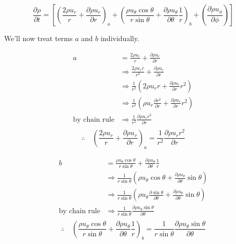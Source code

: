 \documentclass[12pt, letterpaper, twoside]{article}
\begin{document}
    \begin{equation}\label{eq:continuitywithaandb}
        \frac{\partial \rho}{\partial t}  =
        \left[
        \left(\frac{2 \rho u_r}{r} + \frac{\partial \rho u_r}{\partial r} \right)_a
        + \left(\frac{\rho u_{\theta} \cos\theta}{r \sin\theta} + 
        \frac{\partial\rho u_{\theta}}{\partial\theta} \frac{1}{r} \right)_b
        + \left(\frac{\partial \rho u_{\phi}}{\partial \phi} \right)
        \right] 
    \end{equation}

    We'll now treat terms \(\boxed{a}\) and \(\boxed{b}\) individually.

    \begin{align*}
        \boxed{a} & = \frac{2 \rho u_r}{r} + \frac{\partial \rho u_r}{\partial r} \\
        & \Rightarrow \frac{2 \rho u_r r}{r^2} + \frac{\partial \rho u_r}{\partial r} \\
        & \Rightarrow \frac{1}{r^2} \left(2\rho u_r r + \frac{\partial \rho u_r}{\partial r} r^2 \right) \\
        & \Rightarrow \frac{1}{r^2} \left(\rho u_r \frac{\partial r^2}{\partial r} + \frac{\partial \rho u_r}{\partial r} r^2 \right) \\
        \text{by chain rule}& \Rightarrow \frac{1}{r^2}  \frac{\partial \rho u_r r^2}{\partial r} \\
    \end{align*}
%
    \begin{equation}\label{eq:terma}
        \therefore\quad
        \left(\frac{2 \rho u_r}{r} + \frac{\partial \rho u_r}{\partial r} \right)_a = \frac{1}{r^2}  \frac{\partial \rho u_r r^2}{\partial r} 
    \end{equation}

    \begin{align*}
        \boxed{b} & = \frac{\rho u_{\theta} \cos\theta}{r \sin\theta} + \frac{\partial\rho u_{\theta}}{\partial\theta} \frac{1}{r} \\
        & \Rightarrow \frac{1}{r\sin\theta} \left(\rho u_{\theta} \cos\theta + \frac{\partial\rho u_{\theta}}{\partial\theta} \sin\theta \right) \\
        & \Rightarrow \frac{1}{r\sin\theta} \left(\rho u_{\theta} \frac{\partial\sin\theta}{\partial\theta} + \frac{\partial\rho u_{\theta}}{\partial\theta} \sin\theta \right) \\
        \text{by chain rule}& \Rightarrow \frac{1}{r\sin\theta} \frac{\partial\rho u_{\theta} \sin\theta}{\partial\theta}  \\
    \end{align*}
%
    \begin{equation}\label{eq:termb}
        \therefore\quad
        \left(\frac{\rho u_{\theta} \cos\theta}{r \sin\theta} + \frac{\partial\rho u_{\theta}}{\partial\theta} \frac{1}{r} \right)_b =
        \frac{1}{r\sin\theta} \frac{\partial\rho u_{\theta} \sin\theta}{\partial\theta} 
    \end{equation}
\end{document}
